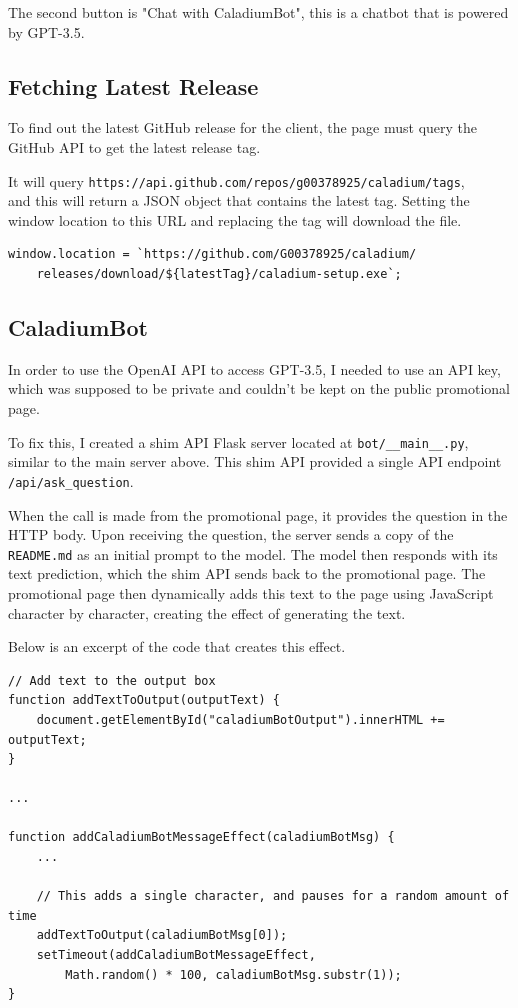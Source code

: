 The second button is "Chat with CaladiumBot",
this is a chatbot that is powered by GPT-3.5.

\subsection{Fetching Latest Release}
To find out the latest GitHub release for the client,
the page must query the GitHub API to get the latest release tag.

It will query \texttt{https://api.github.com/repos/g00378925/caladium/tags}, \\
and this will return a JSON object that contains the latest tag.
Setting the window location to this URL and
replacing the tag will download the file.

\begin{lstlisting}
window.location = `https://github.com/G00378925/caladium/
    releases/download/${latestTag}/caladium-setup.exe`;
\end{lstlisting}

\subsection{CaladiumBot}
In order to use the OpenAI API to access GPT-3.5,
I needed to use an API key, which was supposed to be private and
couldn't be kept on the public promotional page.

To fix this, I created a shim API Flask server located at 
\texttt{bot/\_\_main\_\_.py}, similar to the main server above.
This shim API provided a single API endpoint \texttt{/api/ask\_question}.

When the call is made from the promotional page,
it provides the question in the HTTP body.
Upon receiving the question,
the server sends a copy of the \texttt{README.md} 
as an initial prompt to the model.
The model then responds with its text prediction,
which the shim API sends back to the promotional page.
The promotional page then dynamically adds
this text to the page using JavaScript character by character,
creating the effect of generating the text.

Below is an excerpt of the code that creates this effect.

\begin{lstlisting}
// Add text to the output box
function addTextToOutput(outputText) {
    document.getElementById("caladiumBotOutput").innerHTML += outputText;
}

...

function addCaladiumBotMessageEffect(caladiumBotMsg) {
    ...

    // This adds a single character, and pauses for a random amount of time
    addTextToOutput(caladiumBotMsg[0]);
    setTimeout(addCaladiumBotMessageEffect,
        Math.random() * 100, caladiumBotMsg.substr(1));
}
\end{lstlisting}
